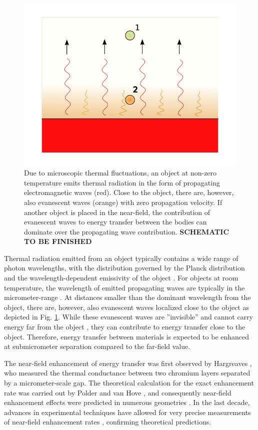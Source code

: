 \begin{figure}
\begin{center}
 \includegraphics[width=.80\columnwidth]{inkscape/thermal_radiation.pdf}
 \caption{Due to microscopic thermal fluctuations, an object at non-zero temperature emits thermal radiation in the form of propagating electromagnetic waves (red). Close to the object, there are, however, also evanescent waves (orange) with zero propagation velocity. If another object is placed in the near-field, the contribution of evanescent waves to energy transfer between the bodies can dominate over the propagating wave contribution. \textbf{SCHEMATIC TO BE FINISHED}}
\label{fig:intro_em}
\end{center}
\end{figure}

Thermal radiation emitted from an object typically contains a wide range of photon wavelengths, with the distribution governed by the Planck distribution \cite{planck00a} and the wavelength-dependent emissivity of the object \cite{}. For objects at room temperature, the wavelength of emitted propagating waves are typically in the micrometer-range \cite{}. At distances smaller than the dominant wavelength from the object, there are, however, also evanescent waves localized close to the object as depicted in Fig. \ref{fig:intro_em}. While these evanescent waves are ''invisible'' and cannot carry energy far from the object \cite{}, they can contribute to energy transfer close to the object. Therefore, energy transfer between materials is expected to be enhanced at submicrometer separation compared to the far-field value. 

The near-field enhancement of energy transfer was first observed by Hargreaves \cite{hargreaves69}, who measured the thermal conductance between two chromium layers separated by a micrometer-scale gap. The theoretical calculation for the exact enhancement rate was carried out by Polder and van Hove \cite{polder71}, and consequently near-field enhancement effects were predicted in numerous geometries \cite{loomis94,pendry99,carminati99,shchegrov00,mulet01,volokitin01}. In the last decade, advances in experimental techniques have allowed for very precise measurements of near-field enhancement rates \cite{kittel05,hu08,shen09,ottens11}, confirming theoretical predictions. 

